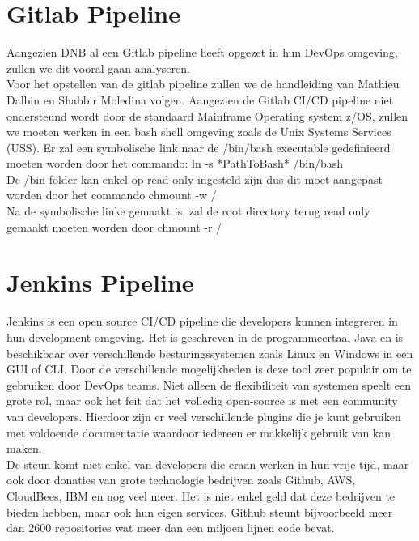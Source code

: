 \section{Gitlab Pipeline}
Aangezien DNB al een Gitlab pipeline heeft opgezet in hun DevOps omgeving, zullen we dit vooral gaan analyseren. \\

Voor het opstellen van de gitlab pipeline zullen we de handleiding van Mathieu Dalbin en Shabbir Moledina volgen.
Aangezien de Gitlab CI/CD pipeline niet ondersteund wordt door de standaard Mainframe Operating system z/OS, zullen we moeten werken in een bash shell omgeving zoals de Unix Systems Services (USS). 
Er zal een symbolische link naar de /bin/bash executable gedefinieerd moeten worden door het commando: ln -s *PathToBash* /bin/bash \\ 
De /bin folder kan enkel op read-only ingesteld zijn dus dit moet aangepast worden door het commando chmount -w / \\
Na de symbolische linke gemaakt is, zal de root directory terug read only gemaakt moeten worden door chmount -r /
\autocite{Dalbin2023}



\section{Jenkins Pipeline}
Jenkins is een open source CI/CD pipeline die developers kunnen integreren in hun development omgeving. Het is geschreven in de programmeertaal Java en is beschikbaar over verschillende besturingssystemen zoals Linux en Windows in een GUI of CLI. Door de verschillende mogelijkheden is deze tool zeer populair om te gebruiken door DevOps teams. Niet alleen de flexibiliteit van systemen speelt een grote rol, maar ook het feit dat het volledig open-source is met een community van developers. Hierdoor zijn er veel verschillende plugins die je kunt gebruiken met voldoende documentatie waardoor iedereen er makkelijk gebruik van kan maken. \autocite{Khan2021} \\
De steun komt niet enkel van developers die eraan werken in hun vrije tijd, maar ook door donaties van grote technologie bedrijven zoals Github, AWS, CloudBees, IBM en nog veel meer. Het is niet enkel geld dat deze bedrijven te bieden hebben, maar ook hun eigen services. Github steunt bijvoorbeeld meer dan 2600 repositories wat meer dan een miljoen lijnen code bevat. \autocite{CdFoundation2023} \\


